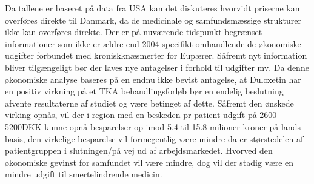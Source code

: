 Da tallene er baseret på data fra USA kan det diskuteres hvorvidt priserne kan overføres direkte til Danmark, da de medicinale og samfundsmæssige strukturer ikke kan overføres direkte. Der er på nuværende tidspunkt begrænset informationer som ikke er ældre end 2004 specifikt omhandlende de økonomiske udgifter forbundet med kroniskknæsmerter for Eupærer. Såfremt nyt information bliver tilgængeligt bør der laves nye antagelser i forhold til udgifter mv. 
Da denne økonomiske analyse baseres på en endnu ikke bevist antagelse, at Duloxetin har en positiv virkning på et TKA behandlingsforløb bør en endelig beslutning afvente resultaterne af studiet og være betinget af dette. Såfremt den ønskede virking opnås, vil der i region med en beskeden pr patient udgift på 2600-5200DKK kunne opnå besparelser op imod 5.4 til 15.8 milioner kroner på lands basis, den virkelige besparelse vil formegentlig være mindre da  er størstedelen af patientgruppen i slutningen/på vej ud af arbejdsmarkedet. Hvorved den økonomiske gevinst for samfundet vil være mindre, dog vil der stadig være en mindre udgift til smertelindrende medicin. 